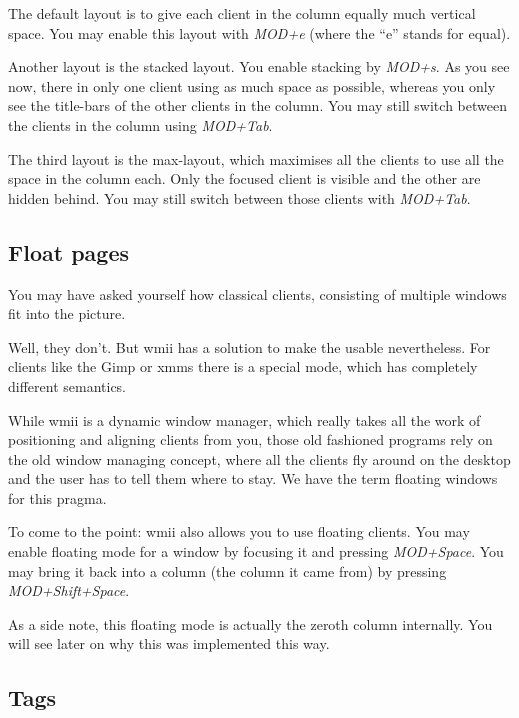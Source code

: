 \documentclass[12pt,a4paper]{article}
\begin{document}
    The default layout is to give each client in the column equally
    much vertical space. You may enable this layout with \emph{MOD+e}
    (where the ``e'' stands for equal).

    Another layout is the stacked layout. You enable stacking by
    \emph{MOD+s}. As you see now, there in only one client using as
    much space as possible, whereas you only see the title-bars of the
    other clients in the column. You may still switch between the
    clients in the column using \emph{MOD+Tab}.

    The third layout is the max-layout, which maximises all the
    clients to use all the space in the column each. Only the focused
    client is visible and the other are hidden behind. You may still
    switch between those clients with \emph{MOD+Tab}.

  \subsection{Float pages}

    You may have asked yourself how classical clients, consisting of
    multiple windows fit into the picture.

    Well, they don't. But wmii has a solution to make the usable
    nevertheless. For clients like the Gimp or xmms there is a special
    mode, which has completely different semantics.

    While wmii is a dynamic window manager, which really takes all the
    work of positioning and aligning clients from you, those old
    fashioned programs rely on the old window managing concept, where
    all the clients fly around on the desktop and the user has to tell
    them where to stay. We have the term floating windows for this
    pragma.

    To come to the point: wmii also allows you to use floating
    clients. You may enable floating mode for a window by focusing it
    and pressing \emph{MOD+Space}. You may bring it back into a column
    (the column it came from) by pressing \emph{MOD+Shift+Space}.

    As a side note, this floating mode is actually the zeroth column
    internally. You will see later on why this was implemented this
    way.

  \subsection{Tags}
\end{document}
